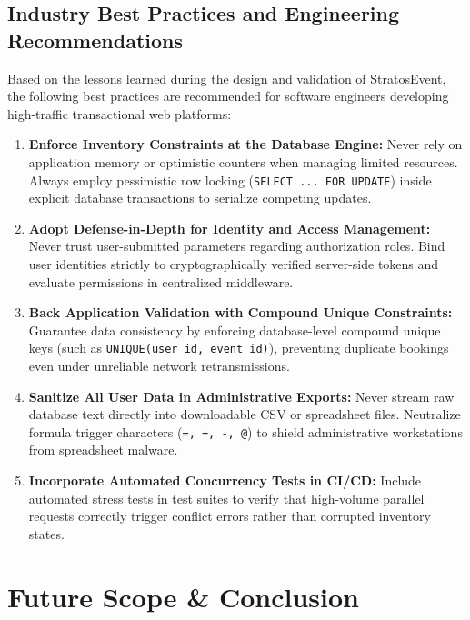 \documentclass[11pt,a4paper]{report}
\begin{document}
\section{Industry Best Practices and Engineering Recommendations}
\justifying
Based on the lessons learned during the design and validation of StratosEvent, the following best practices are recommended for software engineers developing high-traffic transactional web platforms:
\begin{enumerate}[leftmargin=1.5em, itemsep=0.5em]
    \item \textbf{Enforce Inventory Constraints at the Database Engine:} Never rely on application memory or optimistic counters when managing limited resources. Always employ pessimistic row locking (\texttt{SELECT ... FOR UPDATE}) inside explicit database transactions to serialize competing updates.
    \item \textbf{Adopt Defense-in-Depth for Identity and Access Management:} Never trust user-submitted parameters regarding authorization roles. Bind user identities strictly to cryptographically verified server-side tokens and evaluate permissions in centralized middleware.
    \item \textbf{Back Application Validation with Compound Unique Constraints:} Guarantee data consistency by enforcing database-level compound unique keys (such as \texttt{UNIQUE(user\_id, event\_id)}), preventing duplicate bookings even under unreliable network retransmissions.
    \item \textbf{Sanitize All User Data in Administrative Exports:} Never stream raw database text directly into downloadable CSV or spreadsheet files. Neutralize formula trigger characters (\texttt{=, +, -, @}) to shield administrative workstations from spreadsheet malware.
    \item \textbf{Incorporate Automated Concurrency Tests in CI/CD:} Include automated stress tests in test suites to verify that high-volume parallel requests correctly trigger conflict errors rather than corrupted inventory states.
\end{enumerate}



\chapter{Future Scope \& Conclusion}
\end{document}
